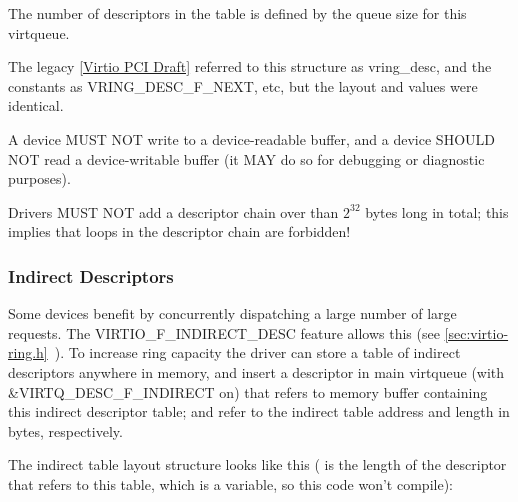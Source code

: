 The number of descriptors in the table is defined by the queue size
for this virtqueue.

\begin{note}
The legacy \hyperref[intro:Virtio PCI Draft]{[Virtio PCI Draft]}
referred to this structure as vring_desc, and the constants as
VRING_DESC_F_NEXT, etc, but the layout and values were identical.
\end{note}

A device MUST NOT write to a device-readable buffer, and a device SHOULD NOT
read a device-writable buffer (it MAY do so for debugging or diagnostic
purposes).

Drivers MUST NOT add a descriptor chain over than $2^{32}$ bytes long in total;
this implies that loops in the descriptor chain are forbidden!

\subsubsection{Indirect Descriptors}\label{sec:Basic Facilities of a Virtio Device / Virtqueues / The Virtqueue Descriptor Table / Indirect Descriptors}

Some devices benefit by concurrently dispatching a large number
of large requests. The VIRTIO_F_INDIRECT_DESC feature allows this (see \ref{sec:virtio-ring.h}~). To increase
ring capacity the driver can store a table of indirect
descriptors anywhere in memory, and insert a descriptor in main
virtqueue (with \&VIRTQ_DESC_F_INDIRECT on) that refers to memory buffer
containing this indirect descriptor table;  and 
refer to the indirect table address and length in bytes,
respectively.

The indirect table layout structure looks like this
( is the length of the descriptor that refers to this table,
which is a variable, so this code won't compile):

